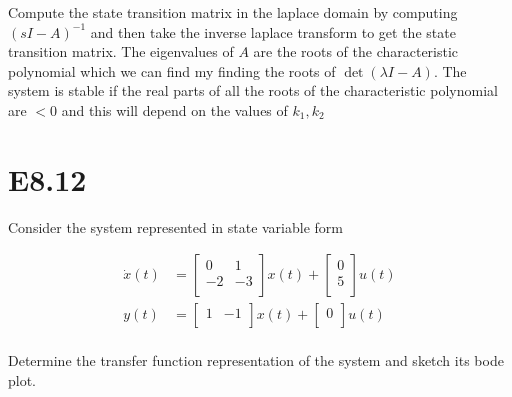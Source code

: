 \documentclass[11pt]{article}
\begin{document}
Compute the state transition matrix in the laplace domain by computing $(sI - A)^{-1}$ and then take the inverse laplace transform to get the state transition matrix. The eigenvalues of $A$ are the roots of the characteristic polynomial which we can find my finding the roots of $\det(\lambda I - A)$. The system is stable if the real parts of all the roots of the characteristic polynomial are $< 0$ and this will depend on the values of $k_1, k_2$

\section{E8.12}

Consider the system represented in state variable form

\begin{align*}
    \dot x(t) &= \begin{bmatrix}
        0 & 1 \\
        -2 & -3 \\
    \end{bmatrix}
    x(t) + \begin{bmatrix}
        0 \\
        5 \\
    \end{bmatrix}
    u(t) \\
    y(t) &= \begin{bmatrix}
        1 & -1 \\
    \end{bmatrix}
    x(t) + \begin{bmatrix}
        0 \\
    \end{bmatrix}
    u(t) \\
\end{align*}

Determine the transfer function representation of the system and sketch its bode plot.
\end{document}
